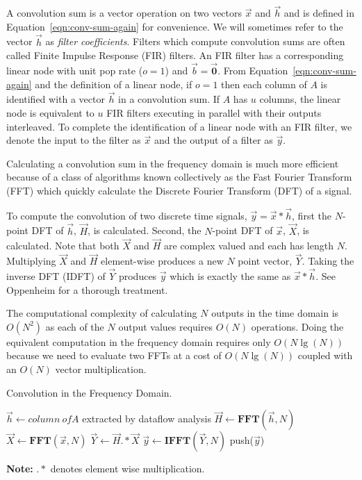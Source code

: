 A convolution sum is a vector operation on two vectors $\vec{x}$ and 
$\vec{h}$ and is defined in Equation~\ref{eqn:conv-sum-again} for
convenience. We will sometimes refer to the vector $\vec{h}$ as 
{\it filter coefficients}. 
Filters which compute convolution sums are often called 
Finite Impulse Response (FIR) filters. An FIR filter has a corresponding linear 
node with unit pop rate ($o=1$) and $\vec{b} = \vec{\mathbf{0}}$. From 
Equation~\ref{eqn:conv-sum-again} and the definition of a linear node,
if $o=1$ then each column of $A$ is identified with a vector $\vec{h}$
in a convolution sum. If $A$ has $u$ columns,	
the linear node is equivalent to $u$ FIR filters 
executing in parallel with their outputs interleaved.
To complete the identification of a linear node with an FIR filter,
we denote the input to the filter as $\vec{x}$ and the output of
a filter as $\vec{y}$.

Calculating a convolution sum in the frequency domain is much
more efficient because of a class of algorithms known collectively as 
the Fast Fourier Transform (FFT) which quickly calculate 
the Discrete Fourier Transform (DFT) of a signal.

To compute the convolution of two discrete time signals, $\vec{y}=\vec{x}*\vec{h}$,
first the $N$-point DFT of $\vec{h}$, $\vec{H}$, is calculated.
Second, the $N$-point DFT of $\vec{x}$, $\vec{X}$, is calculated.
Note that both $\vec{X}$ and $\vec{H}$ are complex valued and each has
length $N$. Multiplying $\vec{X}$ and $\vec{H}$ element-wise produces a new $N$ point
vector, $\vec{Y}$. Taking the inverse DFT (IDFT) of $\vec{Y}$ produces 
$\vec{y}$ which is exactly the same as $\vec{x}*\vec{h}$. See Oppenheim
\cite{oppenheim-discrete} for a thorough treatment.

The computational complexity of calculating $N$ outputs in the time domain
is $O(N^2)$ as each of the $N$ output values requires $O(N)$ operations.
Doing the equivalent computation in the frequency domain requires
only $O(N \lg(N))$ because we need to evaluate two FFTs at a cost of
$O(N \lg(N))$ coupled with an $O(N)$ vector multiplication.

\begin{algorithm}
  \caption{Convolution in the Frequency Domain.\label{alg:freq-overview}}
  \begin{algorithmic}
    \STATE $\vec{h} \leftarrow {\mathit column~of}A$ extracted by dataflow analysis
    \STATE $\vec{H} \leftarrow \mathbf{FFT}(\vec{h},N)$ 
      \STATE $\vec{X} \leftarrow \mathbf{FFT}(\vec{x},N)$
      \STATE $\vec{Y} \leftarrow \vec{H} .* \vec{X}$ 
      \STATE $\vec{y} \leftarrow \mathbf{IFFT}(\vec{Y},N)$
      \STATE push($\vec{y}$)
    \ENDWHILE
  \end{algorithmic}
  {\bf Note:} $.*$ denotes element wise multiplication.
\end{algorithm}

